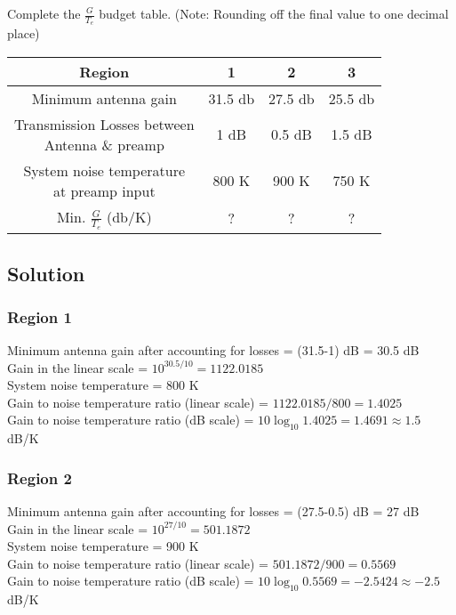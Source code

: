 \documentclass[titlepage]{article}
\begin{document}
\begin{tcolorbox}
    Complete the $\frac{G}{T_e}$ budget table. (Note: Rounding off the final value to one decimal place)
    \begin{center}
        \begin{tabular}{||c | c | c | c||}
            \hline
            Region                      & 1       & 2       & 3       \\[0.5ex]
            \hline\hline
            Minimum antenna gain        & 31.5 db & 27.5 db & 25.5 db \\[0.5ex]
            \hline
            \makecell{Transmission Losses between                     \\ Antenna \& preamp} & 1 dB & 0.5 dB & 1.5 dB \\[0.5ex]
            \hline
            \makecell{System noise temperature                        \\ at preamp input} & 800 K & 900 K & 750 K \\[0.5ex]
            \hline
            Min. $\frac{G}{T_e}$ (db/K) & ?       & ?       & ?       \\[0.5ex]
            \hline
        \end{tabular}
    \end{center}
\end{tcolorbox}

\subsection{Solution}
\subsubsection*{Region 1}
Minimum antenna gain after accounting for losses = (31.5-1) dB = 30.5 dB \\
Gain in the linear scale = $10^{30.5/10} = 1122.0185$ \\
System noise temperature = 800 K \\
Gain to noise temperature ratio (linear scale) = $1122.0185/800 = 1.4025$ \\
Gain to noise temperature ratio (dB scale) = $10\log_{10} 1.4025 = 1.4691 \approx 1.5$ dB/K
\subsubsection*{Region 2}
Minimum antenna gain after accounting for losses = (27.5-0.5) dB = 27 dB \\
Gain in the linear scale = $10^{27/10} = 501.1872$ \\
System noise temperature = 900 K \\
Gain to noise temperature ratio (linear scale) = $501.1872/900 = 0.5569$ \\
Gain to noise temperature ratio (dB scale) = $10\log_{10} 0.5569 = -2.5424\approx -2.5$ dB/K
\end{document}
